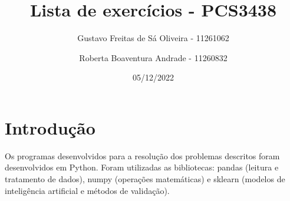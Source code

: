 \documentclass[11pt]{article}
\title{Lista de exercícios - PCS3438}
\author{
    Gustavo Freitas de Sá Oliveira - 11261062
    \and
    Roberta Boaventura Andrade - 11260832
}
\date{05/12/2022}
\begin{document}
\maketitle

\section{Introdução}

Os programas desenvolvidos para a resolução dos problemas descritos foram desenvolvidos em Python. Foram utilizadas as bibliotecas: pandas (leitura e tratamento de dados), numpy (operações matemáticas) e sklearn (modelos de inteligência artificial e métodos de validação).





\end{document}
